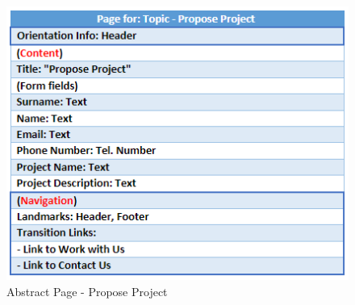 \documentclass[11pt, letterpaper]{article}
\begin{document}
\begin{figure}[H]
    \centering
    \includegraphics[width=15cm]{images/Abstract Pages/AB - Propose Project.png}
    \caption{Abstract Page - Propose Project}
    \label{fig:AbstractPage_Propose_Project}
\end{figure}

\end{document}
